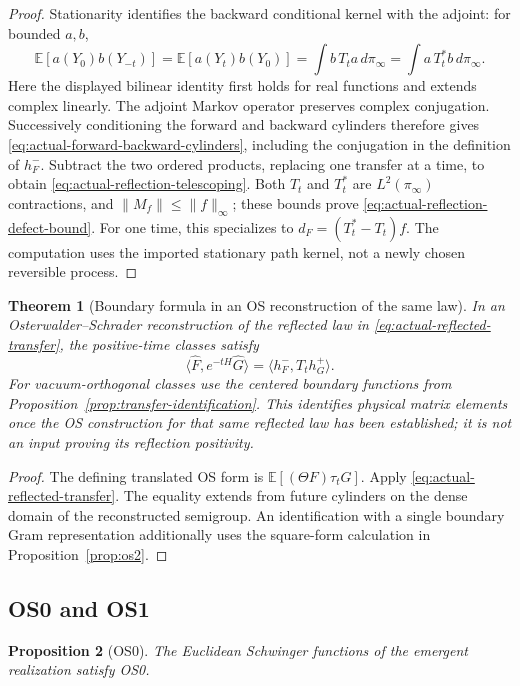 \documentclass[11pt]{article}
\newtheorem{theorem}{Theorem}[section]
\newtheorem{proposition}[theorem]{Proposition}
\theoremstyle{definition}
\theoremstyle{remark}
\begin{document}
\begin{proof}
Stationarity identifies the backward conditional kernel with the adjoint:
for bounded $a,b$,
\[
\mathbb E[a(Y_0)b(Y_{-t})]
=\mathbb E[a(Y_t)b(Y_0)]
=\int b\,T_ta\,d\pi_\infty
=\int a\,T_t^*b\,d\pi_\infty.
\]
Here the displayed bilinear identity first holds for real functions and
extends complex linearly. The adjoint Markov operator preserves complex
conjugation. Successively conditioning the forward and backward cylinders
therefore gives \eqref{eq:actual-forward-backward-cylinders}, including
the conjugation in the definition of $h_F^-$. Subtract the two ordered
products, replacing one transfer at a time, to obtain
\eqref{eq:actual-reflection-telescoping}. Both $T_t$ and $T_t^*$ are
$L^2(\pi_\infty)$ contractions, and $\|M_f\|\le\|f\|_\infty$;
these bounds prove \eqref{eq:actual-reflection-defect-bound}.
For one time, this specializes to $d_F=(T_t^*-T_t)f$.
The computation uses the imported stationary path kernel, not a newly
chosen reversible process.
\end{proof}

\begin{theorem}[Boundary formula in an OS reconstruction of the same law]
\label{thm:aux-to-physical-semigroup}
In an Osterwalder--Schrader reconstruction of the reflected law in
\eqref{eq:actual-reflected-transfer}, the positive-time classes satisfy
\[
\langle\widehat F,e^{-tH}\widehat G\rangle
=\langle h_F^-,T_t h_G^+\rangle.
\]
For vacuum-orthogonal classes use the centered boundary functions from
Proposition~\ref{prop:transfer-identification}. This identifies physical
matrix elements once the OS construction for that same reflected law has
been established; it is not an input proving its reflection positivity.
\end{theorem}

\begin{proof}
The defining translated OS form is $\mathbb E[(\Theta F)\tau_tG]$.
Apply \eqref{eq:actual-reflected-transfer}. The equality extends from
future cylinders on the dense domain of the reconstructed semigroup.
An identification with a single boundary Gram representation additionally
uses the square-form calculation in Proposition~\ref{prop:os2}.
\end{proof}


\subsection{OS0 and OS1}

\begin{proposition}[OS0]
\label{prop:os0}
The Euclidean Schwinger functions of the emergent realization satisfy OS0.
\end{proposition}
\end{document}
